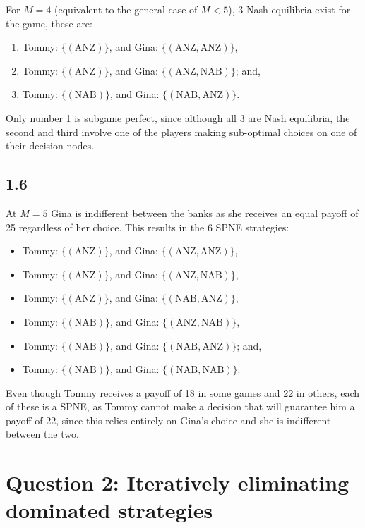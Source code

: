 \documentclass{article}
\begin{document}
\noindent For $M=4$ (equivalent to the general case of $M<5$), 3 Nash equilibria exist for the game, these are:
\begin{enumerate}
    \item Tommy: $\{(\mbox{ANZ})\}$, and Gina: $\{(\mbox{ANZ}, \mbox{ANZ})\}$,
    \item Tommy: $\{(\mbox{ANZ})\}$, and Gina: $\{(\mbox{ANZ}, \mbox{NAB})\}$; and,
    \item Tommy: $\{(\mbox{NAB})\}$, and Gina: $\{(\mbox{NAB}, \mbox{ANZ})\}$.
\end{enumerate}
Only number 1 is subgame perfect, since although all 3 are Nash equilibria, the second and third involve one of the players making sub-optimal choices on one of their decision nodes.

\subsection*{1.6}
At $M=5$ Gina is indifferent between the banks as she receives an equal payoff of 25 regardless of her choice. This results in the 6 SPNE strategies:
\begin{itemize}
    \item Tommy: $\{(\mbox{ANZ})\}$, and Gina: $\{(\mbox{ANZ}, \mbox{ANZ})\}$,
    \item Tommy: $\{(\mbox{ANZ})\}$, and Gina: $\{(\mbox{ANZ}, \mbox{NAB})\}$,
    \item Tommy: $\{(\mbox{ANZ})\}$, and Gina: $\{(\mbox{NAB}, \mbox{ANZ})\}$,
    \item Tommy: $\{(\mbox{NAB})\}$, and Gina: $\{(\mbox{ANZ}, \mbox{NAB})\}$,
    \item Tommy: $\{(\mbox{NAB})\}$, and Gina: $\{(\mbox{NAB}, \mbox{ANZ})\}$; and,
    \item Tommy: $\{(\mbox{NAB})\}$, and Gina: $\{(\mbox{NAB}, \mbox{NAB})\}$.
\end{itemize}
Even though Tommy receives a payoff of 18 in some games and 22 in others, each of these is a SPNE, as Tommy cannot make a decision that will guarantee him a payoff of 22, since this relies entirely on Gina's choice and she is indifferent between the two.

\section*{Question 2: Iteratively eliminating dominated strategies}
\end{document}
